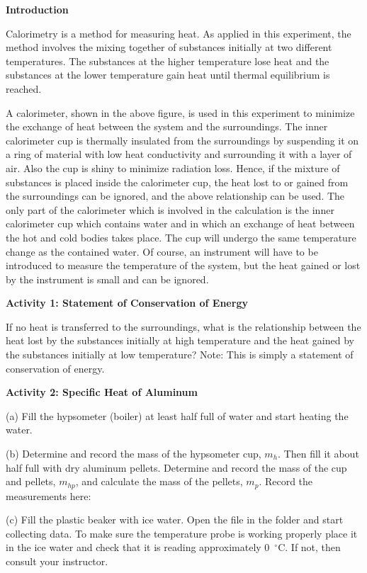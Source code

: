 \bigskip
\textbf{Introduction} 

Calorimetry is a method for measuring heat. As applied in this experiment,
the method involves the mixing together of substances initially at
two different temperatures. The substances at the higher temperature
lose heat and the substances at the lower temperature gain heat until
thermal equilibrium is reached.


A calorimeter, shown in the above figure, is used in this experiment
to minimize the exchange of heat between the system and the surroundings.
The inner calorimeter cup is thermally insulated from the surroundings
by suspending it on a ring of material with low heat conductivity
and surrounding it with a layer of air. Also the cup is shiny to minimize
radiation loss. Hence, if the mixture of substances is placed inside
the calorimeter cup, the heat lost to or gained from the surroundings
can be ignored, and the above relationship can be used. The only part
of the calorimeter which is involved in the calculation is the inner
calorimeter cup which contains water and in which an exchange of heat
between the hot and cold bodies takes place. The cup will undergo
the same temperature change as the contained water. Of course, an
instrument will have to be introduced to measure the temperature of
the system, but the heat gained or lost by the instrument is small
and can be ignored.

\textbf{Activity 1: Statement of Conservation of Energy}

If no heat is transferred to the surroundings, what is the relationship
between the heat lost by the substances initially at high temperature
and the heat gained by the substances initially at low temperature?
Note: This is simply a statement of conservation of energy.
\answerspace{15mm}

\pagebreak[3]
\textbf{Activity 2: Specific Heat of Aluminum}

(a) Fill the hypsometer (boiler) at least half full of water and start
heating the water.

(b) Determine and record the mass of the hypsometer cup, $m_h$.
Then fill it about half full with dry aluminum pellets. Determine
and record the mass of the cup and pellets, $m_{hp}$, and calculate
the mass of the pellets, $m_p$. Record the measurements here:
\answerspace{10mm}

(c) Fill the plastic beaker with ice water. Open the file 
in the \filename{\coursefolder} folder and start
collecting data. To make sure the temperature probe is working 
properly place it in the ice water and
check that it is reading approximately 0~$^{\circ }$C. If not,
then consult your instructor.

